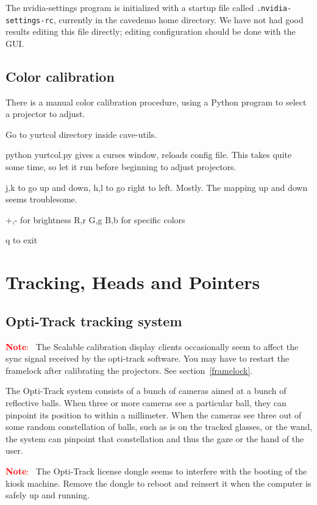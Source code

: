 \documentclass[11pt]{article}
\newenvironment{note}[1][Note]{\begin{lrbox}{\notebox}%
    \begin{minipage}{0.9\columnwidth}\textcolor{red}{\textbf{#1}:~}}%
    {\end{minipage}\end{lrbox}\begin{center}\setlength{\fboxsep}{8pt}%
    \fbox{\usebox{\notebox}}\end{center}}
\newcommand{\cmd}[1]{\texttt{#1}\xspace}
\begin{document}
The nvidia-settings program is initialized with a startup file called
\cmd{.nvidia-settings-rc}, currently in the cavedemo home
directory.  We have not had good results editing this file directly;
editing configuration should be done with the GUI.


\subsection{Color calibration}

There is a manual color calibration procedure, using a Python program
to select a projector to adjust.

Go to yurtcol directory inside cave-utils.

python yurtcol.py gives a curses window, reloads config file.  This
takes quite some time, so let it run before beginning to adjust
projectors.

j,k to go up and down, h,l to go right to left. Mostly. The mapping up
and down seems troublesome.

+,- for brightness
R,r G,g B,b for specific colors


q to exit


\section{Tracking, Heads and Pointers}

\subsection{Opti-Track tracking system}
\label{opti-track}

\begin{note}
  The Scalable calibration display clients occasionally seem to affect
  the sync signal received by the opti-track software.  You may have
  to restart the framelock after calibrating the projectors.  See
  section~\ref{framelock}.
\end{note}

The Opti-Track system consists of a bunch of cameras aimed at a bunch
of reflective balls.  When three or more cameras see a particular
ball, they can pinpoint its position to within a millimeter.  When the
cameras see three out of some random constellation of balls, such as
is on the tracked glasses, or the wand, the system can pinpoint that
constellation and thus the gaze or the hand of the user.


\begin{note}
  The Opti-Track license dongle seems to interfere with the booting of
  the kiosk machine.  Remove the dongle to reboot and reinsert it when
  the computer is safely up and running.
\end{note}
\end{document}
